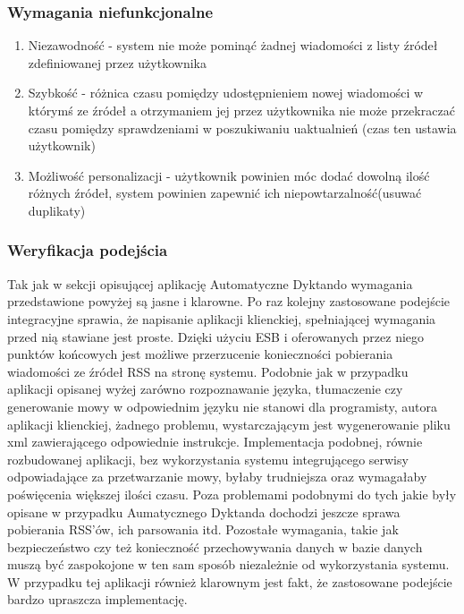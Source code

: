 \subsubsection{Wymagania niefunkcjonalne}
\begin{enumerate}
	\item Niezawodność - system nie może pominąć żadnej wiadomości z listy źródeł zdefiniowanej przez użytkownika
	\item Szybkość - różnica czasu pomiędzy udostępnieniem nowej wiadomości w którymś ze źródeł a otrzymaniem jej przez użytkownika nie może przekraczać czasu pomiędzy sprawdzeniami w poszukiwaniu uaktualnień (czas ten ustawia użytkownik)
	\item Możliwość personalizacji - użytkownik powinien móc dodać dowolną ilość różnych źródeł, system powinien zapewnić ich niepowtarzalność(usuwać duplikaty)
\end{enumerate}

\subsubsection{Weryfikacja podejścia}
Tak jak w sekcji opisującej aplikację Automatyczne Dyktando wymagania przedstawione powyżej są jasne i klarowne. Po raz kolejny zastosowane podejście integracyjne sprawia, że napisanie aplikacji klienckiej, spełniającej wymagania przed nią stawiane jest proste. Dzięki użyciu ESB i oferowanych przez niego punktów końcowych jest możliwe przerzucenie konieczności pobierania wiadomości ze źródeł RSS na stronę systemu. Podobnie jak w przypadku aplikacji opisanej wyżej zarówno rozpoznawanie języka, tłumaczenie czy generowanie mowy w odpowiednim języku nie stanowi dla programisty, autora aplikacji klienckiej, żadnego problemu, wystarczającym jest wygenerowanie pliku xml zawierającego odpowiednie instrukcje. Implementacja podobnej, równie rozbudowanej aplikacji, bez wykorzystania systemu integrującego serwisy odpowiadające za przetwarzanie mowy, byłaby trudniejsza oraz wymagałaby poświęcenia większej ilości czasu. Poza problemami podobnymi do tych jakie były opisane w przypadku Aumatycznego Dyktanda dochodzi jeszcze sprawa pobierania RSS'ów, ich parsowania itd. Pozostałe wymagania, takie jak bezpieczeństwo czy też konieczność przechowywania danych w bazie danych muszą być zaspokojone w ten sam sposób niezależnie od wykorzystania systemu. \\
W przypadku tej aplikacji również klarownym jest fakt, że zastosowane podejście bardzo upraszcza implementację.

